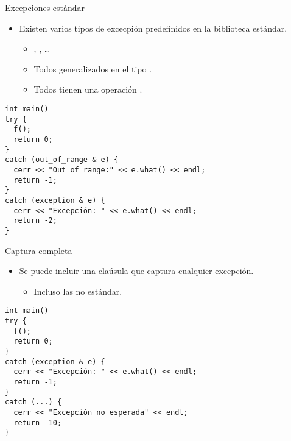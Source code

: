 \begin{frame}[fragile]{Excepciones estándar}
\begin{itemize}
  \item Existen varios tipos de excecpión predefinidos en la biblioteca estándar.
    \begin{itemize}
      \item {}, , \ldots
      \item Todos generalizados en el tipo .
      \item Todos tienen una operación .
    \end{itemize}
\end{itemize}
\begin{lstlisting}
int main()
try {
  f();
  return 0;
}
catch (out_of_range & e) {
  cerr << "Out of range:" << e.what() << endl;
  return -1;
}
catch (exception & e) {
  cerr << "Excepción: " << e.what() << endl;
  return -2;
}
\end{lstlisting}
\end{frame}

\begin{frame}[fragile]{Captura completa}
\begin{itemize}
  \item Se puede incluir una claúsula que captura cualquier excepción.
    \begin{itemize}
      \item Incluso las no estándar.
    \end{itemize}
\end{itemize}
\begin{lstlisting}
int main()
try {
  f();
  return 0;
}
catch (exception & e) {
  cerr << "Excepción: " << e.what() << endl;
  return -1;
}
catch (...) {
  cerr << "Excepción no esperada" << endl;
  return -10;
}
\end{lstlisting}
\end{frame}
